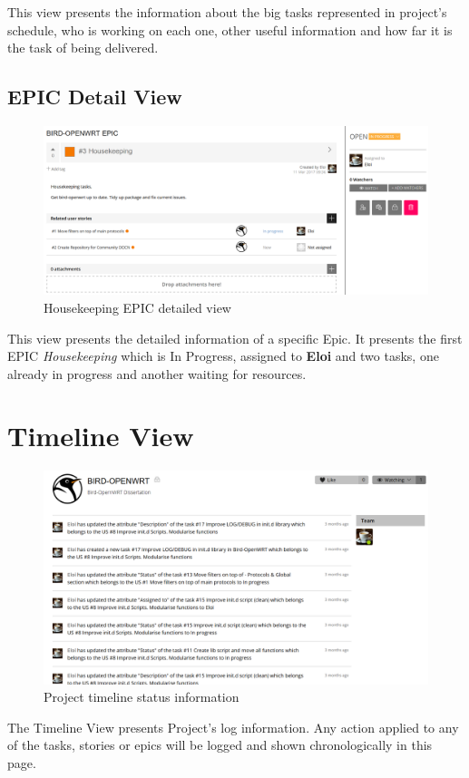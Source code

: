 \begin{appendices}
\begin{landscape}
This view presents the information about the big tasks represented in project's schedule, who is working on each one, other useful information and how far it is the task of being delivered.
\newpage

\subsection{EPIC Detail View}
\begin{figure}[h!]
\centering
    \includegraphics[width=0.85\hsize]{images/kanban/epic-details}
    \caption{Housekeeping EPIC detailed view}
    \label{fig:kepicd}
\end{figure}
This view presents the detailed information of a specific Epic. It presents the first EPIC \textit{Housekeeping} which is In Progress, assigned to \textbf{Eloi} and two tasks, one already in progress and another waiting for resources.
\newpage

\section{Timeline View}
\begin{figure}[h!]
\centering
    \includegraphics[width=0.7\hsize]{images/kanban/timeline}
    \caption{Project timeline status information}
    \label{fig:ktimeline}
\end{figure}
The Timeline View presents Project's log information. Any action applied to any of the tasks, stories or epics will be logged and shown chronologically in this page.
\newpage


\end{landscape}
\end{appendices}
